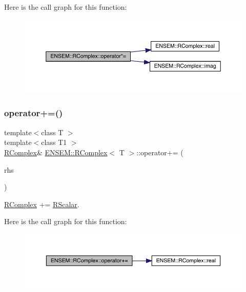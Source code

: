 Here is the call graph for this function\+:
\nopagebreak
\begin{figure}[H]
\begin{center}
\leavevmode
\includegraphics[width=350pt]{d9/d0e/classENSEM_1_1RComplex_a9b5f1c26c1d2cca0a3a0a6d38b5e49bd_cgraph}
\end{center}
\end{figure}
\mbox{\label{classENSEM_1_1RComplex_a0a7beaab81b8f5e2129a4c7b1074f85c}} 
\subsubsection{\texorpdfstring{operator+=()}{operator+=()}\hspace{0.1cm}{\footnotesize\ttfamily [1/4]}}
{\footnotesize\ttfamily template$<$class T $>$ \\
template$<$class T1 $>$ \\
\mbox{\hyperlink{classENSEM_1_1RComplex}{R\+Complex}}\& \mbox{\hyperlink{classENSEM_1_1RComplex}{E\+N\+S\+E\+M\+::\+R\+Complex}}$<$ T $>$\+::operator+= (\begin{DoxyParamCaption}\item[{const \mbox{\hyperlink{classENSEM_1_1RScalar}{R\+Scalar}}$<$ T1 $>$ \&}]{rhs }\end{DoxyParamCaption})\hspace{0.3cm}{\ttfamily [inline]}}



\mbox{\hyperlink{classENSEM_1_1RComplex}{R\+Complex}} += \mbox{\hyperlink{classENSEM_1_1RScalar}{R\+Scalar}}. 

Here is the call graph for this function\+:
\nopagebreak
\begin{figure}[H]
\begin{center}
\leavevmode
\includegraphics[width=350pt]{d9/d0e/classENSEM_1_1RComplex_a0a7beaab81b8f5e2129a4c7b1074f85c_cgraph}
\end{center}
\end{figure}
\mbox{\label{classENSEM_1_1RComplex_a0a7beaab81b8f5e2129a4c7b1074f85c}} 
